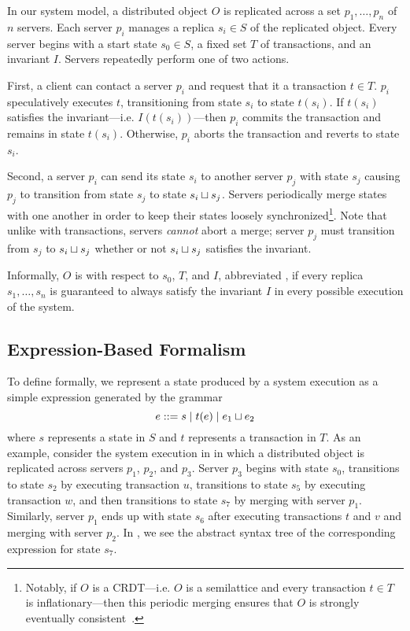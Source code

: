 In our system model, a distributed object $O$ is replicated across a set $p_1,
\ldots, p_n$ of $n$ servers. Each server $p_i$ manages a replica $s_i \in S$ of
the replicated object. Every server begins with a start state $s_0 \in S$, a
fixed set $T$ of transactions, and an invariant $I$. Servers repeatedly perform
one of two actions.

First, a client can contact a server $p_i$ and request that it
 a transaction $t \in T$. $p_i$ speculatively executes
$t$, transitioning from state $s_i$ to state $t(s_i)$. If $t(s_i)$ satisfies
the invariant---i.e.  $I(t(s_i))$---then $p_i$ commits the transaction and
remains in state $t(s_i)$.  Otherwise, $p_i$ aborts the transaction and reverts
to state $s_i$.

Second, a server $p_i$ can send its state $s_i$ to another server $p_j$ with
state $s_j$ causing $p_j$ to transition from state $s_j$  to state $s_i \sqcup
s_j$. Servers periodically merge states with one another in order to keep their
states loosely synchronized\footnote{%
  Notably, if $O$ is a CRDT---i.e. $O$ is a semilattice and every transaction
  $t \in T$ is inflationary---then this periodic merging ensures that $O$ is
  strongly eventually consistent~\cite{shapiro2011conflict}.
}.
Note that unlike with transactions, servers \emph{cannot} abort a merge; server
$p_j$ must transition from $s_j$ to $s_i \sqcup s_j$ whether or not $s_i \sqcup
s_j$ satisfies the invariant.

Informally, $O$ is  with respect to $s_0$, $T$,
and $I$, abbreviated , if every replica $s_1, \ldots,
s_n$ is guaranteed to always satisfy the invariant $I$ in every possible
execution of the system.

\subsection{Expression-Based Formalism}
To define \invariantconfluence{} formally, we represent a state produced by a
system execution as a simple expression generated by the grammar
%
\[
  \hfill
  e ::= s \mid t(e) \mid e_1 \join e_2
  \hfill
\]
%
where $s$ represents a state in $S$ and $t$ represents a transaction in $T$. As
an example, consider the system execution in  in which
a distributed object is replicated across servers $p_1$, $p_2$, and $p_3$.
Server $p_3$ begins with state $s_0$, transitions to state $s_2$ by executing
transaction $u$, transitions to state $s_5$ by executing transaction $w$, and
then transitions to state $s_7$ by merging with server $p_1$. Similarly, server
$p_1$ ends up with state $s_6$ after executing transactions $t$ and $v$ and
merging with server $p_2$. In , we see the abstract syntax
tree of the corresponding expression for state $s_7$.

